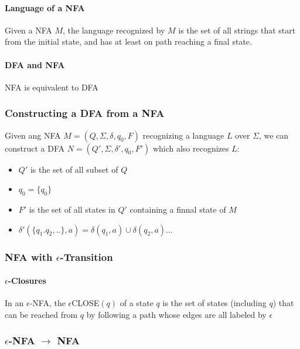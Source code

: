 \documentclass[titlepage]{article}
\begin{document}
            \paragraph{Language of a NFA}
            Given a NFA $M$, the language recognized by $M$ is the set of all strings that start from the initial state, and has at least on path reaching a final state.
            \paragraph{DFA and NFA}
            NFA is equivalent to DFA
        \subsubsection*{Constructing a DFA from a NFA}
        Given ang NFA $M=(Q,\Sigma,\delta,q_0,F)$ recognizing a language $L$ over $\Sigma$, we can construct a DFA $N=(Q',\Sigma,\delta',q_0,F')$ which also recognizes $L$:
        \begin{itemize}
            \item $Q'$ is the set of all subset of $Q$
            \item $q_0=\{q_0\}$
            \item $F'$ is the set of all states in $Q'$ containing a finnal state of $M$
            \item $\delta'(\{q_1.q_2,..\},a)=\delta(q_1,a)\cup\delta(q_2,a)...$
        \end{itemize}
        \subsubsection*{NFA with $\epsilon$-Transition}
        \paragraph{$\epsilon$-Closures}
        In an $\epsilon$-NFA, the $\epsilon$CLOSE$(q)$ of a state $q$ is the set of states (including $q$) that can be reached from $q$ by following a path whose edges are all labeled by $\epsilon$
        \subsubsection*{$\epsilon$-NFA $\rightarrow$ NFA}
        
\end{document}
